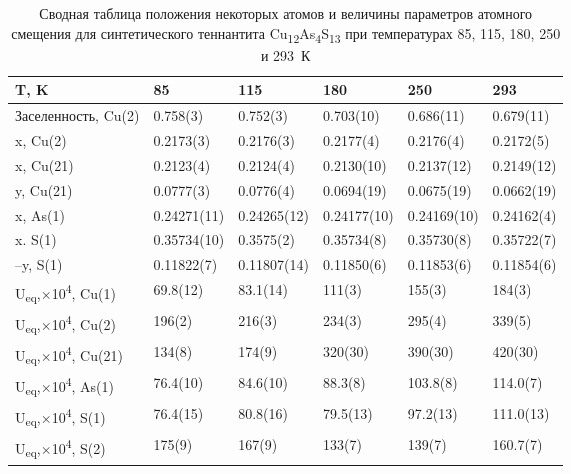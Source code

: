 \begin{landscape}
\begin{table} [htbp]
\centering
\caption{Сводная таблица положения некоторых атомов и величины параметров атомного смещения для синтетического теннантита Cu\textsubscript{12}As\textsubscript{4}S\textsubscript{13} при температурах 85, 115, 180, 250 и 293~К}%
	\label{xray2}%
    \renewcommand{\arraystretch}{1.5}
	\begin{tabular}{@{}@{\extracolsep{20pt}}llllll@{}}
 \toprule     %
T, K             	          & 85 	         & 115  	       & 180    	     & 250    	     & 293         \\
   \midrule
Заселенность, Cu(2) & 0.758(3)    & 0.752(3)    	 & 0.703(10)     & 0.686(11)    & 0.679(11)    \\
x, Cu(2)         		 & 0.2173(3)   & 0.2176(3)   	 & 0.2177(4)   	& 0.2176(4)   & 0.2172(5) \\
x, Cu(21)        		 & 0.2123(4)   & 0.2124(4)   	 & 0.2130(10)   & 0.2137(12)   & 0.2149(12)   \\
y, Cu(21)       		 & 0.0777(3)   & 0.0776(4)   	 & 0.0694(19)   & 0.0675(19)   & 0.0662(19)   \\
x, As(1)         		& 0.24271(11)  & 0.24265(12)  	 & 0.24177(10)  & 0.24169(10)  & 0.24162(4)  \\
x. S(1)          		& 0.35734(10) & 0.3575(2) 	 & 0.35734(8)  & 0.35730(8)  & 0.35722(7)  \\
–y, S(1)         		 & 0.11822(7) & 0.11807(14)	 & 0.11850(6) 	& 0.11853(6) & 0.11854(6) \\
U\textsubscript{eq},$ \times$10\textsuperscript{4}, Cu(1)   & 69.8(12)       & 83.1(14)       & 111(3)      	    & 155(3)       & 184(3)      \\
U\textsubscript{eq},$ \times$10\textsuperscript{4}, Cu(2)   & 196(2)   	& 216(3)          & 234(3)         & 295(4)       & 339(5)      \\
U\textsubscript{eq},$ \times$10\textsuperscript{4}, Cu(21)  & 134(8)      	& 174(9)          & 320(30)       & 390(30)     & 420(30)     \\
U\textsubscript{eq},$ \times$10\textsuperscript{4}, As(1)   & 76.4(10)     	& 84.6(10)      & 88.3(8)         & 103.8(8)    & 114.0(7)    \\
U\textsubscript{eq},$ \times$10\textsuperscript{4}, S(1)    & 76.4(15)    	& 80.8(16)      & 79.5(13)        & 97.2(13)    & 111.0(13)   \\
U\textsubscript{eq},$ \times$10\textsuperscript{4}, S(2)    & 175(9)      	& 167(9)         & 133(7)  	     & 139(7)       & 160.7(7)  \\ \hline
 \bottomrule
\end{tabular}
\end{table}
\end{landscape}

